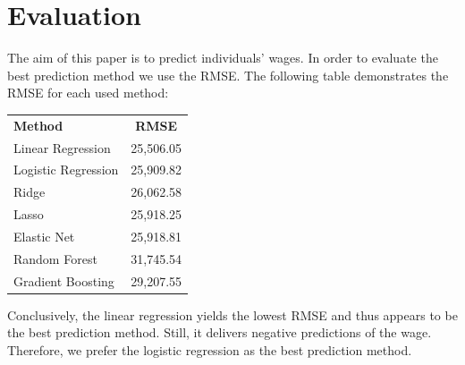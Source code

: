 \documentclass[11pt,a4paper]{article}
\begin{document}
\hypertarget{evaluation}{%
\section{Evaluation}\label{evaluation}}

The aim of this paper is to predict individuals' wages. In order to
evaluate the best prediction method we use the RMSE. The following table
demonstrates the RMSE for each used method: \medskip

\begin{tabular}{l c} 
\textbf{Method} & \textbf{RMSE} \\ 
Linear Regression & 25,506.05 \\ 
Logistic Regression & 25,909.82 \\ 
Ridge & 26,062.58 \\ 
Lasso & 25,918.25 \\
Elastic Net & 25,918.81 \\ 
Random Forest & 31,745.54 \\ 
Gradient Boosting & 29,207.55 \\ 
\end{tabular}

\medskip

Conclusively, the linear regression yields the lowest RMSE and thus
appears to be the best prediction method. Still, it delivers negative
predictions of the wage. Therefore, we prefer the logistic regression as
the best prediction method.
\end{document}
